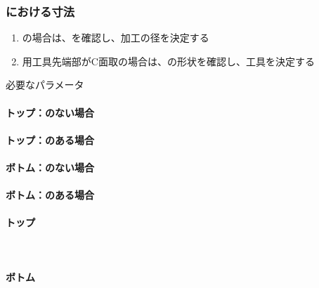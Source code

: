\subsubsection{\EndFaceChamferMilling における寸法}
\begin{enumerate}[label=\sarrow]
\item \EndFaceOutCChamfer の場合は、\OutcutExists を確認し、加工の径を決定する
\item {}\nameOutcut 用工具先端部がC面取の場合は、\nameOutcut の形状を確認し、工具を決定する
\end{enumerate}
\begin{Parameter}{必要なパラメータ}
\paragraph*{トップ\EndFaceOutCChamfer：\Outcut のない場合}
\PMACOD
\PMBDOD
\PMTopEndFaceOutCChamferLength
\PMODCornerR
\tcbline*
\paragraph*{トップ\EndFaceOutCChamfer：\Outcut のある場合}
\PMTopOutcutACwidth
\PMTopOutcutBDwidth
\PMTopOutcutCornerR
\PMTopEndFaceOutCChamferLength
\tcbline*
\paragraph*{ボトム\EndFaceOutCChamfer：\Outcut のない場合}
\PMACOD
\PMBDOD
\PMBottomEndFaceOutCChamferLength
\PMODCornerR
\tcbline*
\paragraph*{ボトム\EndFaceOutCChamfer：\Outcut のある場合}
\PMBottomOutcutACwidth
\PMBottomOutcutBDwidth
\PMBottomOutcutConerR
\PMBottomEndFaceOutCChamferLength
\tcbline*
\paragraph*{トップ\EndFaceInCChamfer}
\PMTopEndACID
\PMTopEndBDID
\PMTopEndIDCornerR\\
\PMTopEndFaceInCChamferLength
\PMPlatingThk
\tcbline*
\paragraph*{ボトム\EndFaceInCChamfer}
\PMBottomEndACID
\PMBottomEndBDID
\PMBottomEndIDCornerR\\
\PMBottomEndFaceInCChamferLength
\PMPlatingThk
\end{Parameter}


